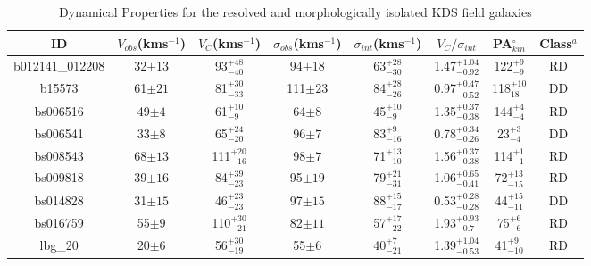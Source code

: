 \documentclass[fleqn,usenatbib]{mn2e}
\begin{document}
\begin{table*}
\centering
\begin{threeparttable}
\caption{Dynamical Properties for the resolved and morphologically isolated KDS field galaxies}
\label{tab:kin_props}
\begin{tabular}{cccccccc}

 \hline
ID & $V_{obs}$(kms$^{-1}$) & $V_{C}$(kms$^{-1}$) & $\sigma_{obs}$(kms$^{-1}$) & $\sigma_{int}$(kms$^{-1}$) & $V_{C}/\sigma_{int}$ & PA$_{kin}^{\circ}$ & Class$^{a}$ \\
 \hline
b012141\_012208 & 32$\pm$13                    & 93$^{+48}_{-40}$                     & 94$\pm$18                 & 63$^{+28}_{-30}$                 & 1.47$^{+1.04}_{-0.92}$             & 122$^{+9}_{-9}$ & RD   \\
b15573          & 61$\pm21$                    & 81$^{+30}_{-33}$                     & 111$\pm23$                 & 84$^{+28}_{-26}$          & 0.97$^{+0.47}_{-0.52}$            & 118$^{+10}_{18}$ & DD   \\
bs006516        & 49$\pm4$                    & 61$^{+10}_{-9}$                     & 64$\pm8$                  & 45$^{+10}_{-9}$              & 1.35$^{+0.37}_{-0.38}$         & 144$^{+4}_{-4}$ & RD   \\
bs006541        & 33$\pm8$         & 65$^{+24}_{-20}$          & 96$\pm7$                  & 83$^{+9}_{-16}$             & 0.78$^{+0.34}_{-0.26}$          & 23$^{+3}_{-4}$ & DD    \\
bs008543        & 68$\pm13$                    & 111$^{+20}_{-16}$                    & 98$\pm7$                  & 71$^{+13}_{-10}$         & 1.56$^{+0.37}_{-0.38}$                & 114$^{+1}_{-1}$  & RD  \\
bs009818        & 39$\pm16$                    & 84$^{+39}_{-23}$                     & 95$\pm19$                  & 79$^{+21}_{-31}$       & 1.06$^{+0.65}_{-0.41}$                   & 72$^{+13}_{-15}$ & RD    \\
bs014828        & 31$\pm15$                    & 46$^{+23}_{-23}$                     & 97$\pm15$                  & 88$^{+15}_{-17}$      & 0.53$^{+0.28}_{-0.28}$               & 44$^{+15}_{-11}$  & DD  \\
bs016759        & 55$\pm9$                    & 110$^{+30}_{-21}$                    & 82$\pm11$                  & 57$^{+17}_{-22}$         & 1.93$^{+0.93}_{-0.7}$               & 75$^{+6}_{-6}$ & RD    \\
lbg\_20         & 20$\pm6$                    & 56$^{+30}_{-19}$                     & 55$\pm6$                  & 40$^{+7}_{-21}$         & 1.39$^{+1.04}_{-0.53}$              & 41$^{+9}_{-10}$ & RD   \\

\end{tabular}
\end{threeparttable}
\end{table*}
\end{document}
